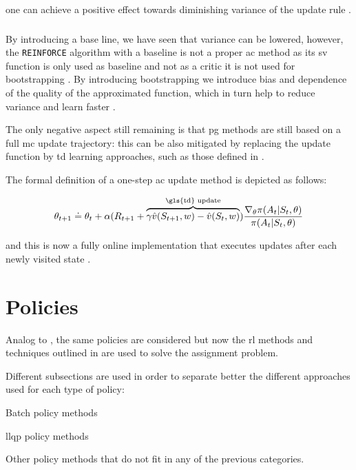one can achieve a positive effect towards diminishing variance of the update rule \citep[p. 271]{Sutton2017}.

\subsubsection{ }

By introducing a base line, we have seen that variance can be lowered, however, the \texttt{REINFORCE} algorithm with a baseline is not a proper \gls{ac} method as its \gls{sv} function is only used as baseline and not as a critic \ie it is not used for bootstrapping \citep[p. 273]{Sutton2017}. By introducing bootstrapping we introduce bias and dependence of the quality of the approximated function, which in turn help to reduce variance and learn faster \citep[p. 273]{Sutton2017}. 

The only negative aspect still remaining is that \gls{pg} methods are still based on a full \gls{mc} update trajectory: this can be also mitigated by replacing the update function by \gls{td} learning approaches, such as those defined in  \citep[p. 273]{Sutton2017}.

The formal definition of a one-step \gls{ac} update method is depicted as follows:

\begin{equation}
	\theta_{t+1} \doteq \theta_t + \alpha(R_{t+1} + \overbrace{\gamma \hat{v}(S_{t+1},w)-\hat{v}(S_t,w)}^{\text{\gls{td} update}}) \frac{\nabla_\theta \pi(A_t|S_t,\theta)}{\pi(A_t|S_t,\theta)}
\end{equation}

and this is now a fully online implementation that executes updates after each newly visited state \citep[p. 274]{Sutton2017}. 

\section{ Policies}
\label{sec:rl_policies}

Analog to , the same policies are considered but now the \gls{rl} methods and techniques outlined in  are used to solve the assignment problem.

Different subsections are used in order to separate better the different approaches used for each type of policy:
\begin{enumerate*}
	\item Batch policy methods
	\item \gls{llqp} policy methods
	\item Other policy methods that do not fit in any of the previous categories.
\end{enumerate*}

